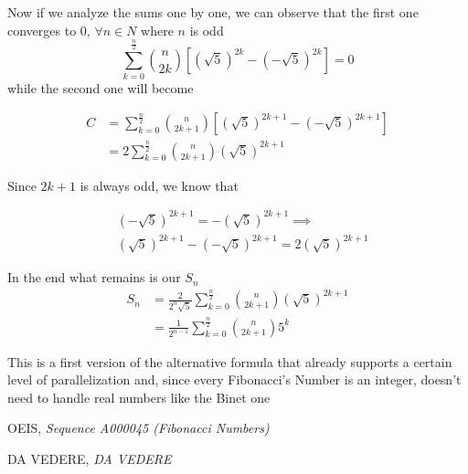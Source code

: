 \documentclass[amsmath,amssymb,aps,pra,reprint,groupedaddress,showpacs]{revtex4-1}
\begin{document}
Now if we analyze the sums one by one, we can observe that the first one converges to 0, $\forall n \in{N}$ where $n$ is odd
$$ \sum_{k=0}^{\frac{n}{2}} \binom{n}{2k} \left[ \left(\sqrt{5} \right) ^{2k} - \left(-\sqrt{5} \right) ^{2k} \right] = 0 $$
while the second one will become

\begin{align*}
C &= \sum_{k=0}^{\frac{n}{2}} \binom{n}{2k + 1} \left[ \left(\sqrt{5} \right) ^{2k + 1} - \left(-\sqrt{5} \right) ^{2k + 1} \right]\\
&= 2 \sum_{k=0}^\frac{n}{2} \binom{n}{2k + 1} \left(\sqrt{5} \right) ^{2k + 1}
\end{align*}

Since $2k + 1$ is always odd, we know that 

\begin{align*}
&\left(-\sqrt{5} \right) ^{2k + 1} =  - \left( \sqrt{5} \right) ^{2k + 1} \implies \\
&\left( \sqrt{5} \right) ^{2k + 1} - \left(-\sqrt{5} \right) ^{2k + 1} = 2\left(\sqrt{5} \right) ^{2k + 1}
\end{align*}

In the end what remains is our $S_n$
\begin{align*}
S_n &= \frac{2}{2^n\sqrt{5}} \sum_{k=0}^\frac{n}{2} \binom{n}{2k + 1} \left( \sqrt{5} \right) ^{2k +1} \\
&=\frac{1}{2^{n-1}} \sum_{k=0}^\frac{n}{2} \binom{n}{2k + 1}5^{k}
\end{align*}

This is a first version of the alternative formula that already supports a certain level of parallelization and, since every Fibonacci's Number is an integer, doesn't need to handle real numbers like the Binet one

\begin{thebibliography}{24}
 
    {OEIS},
    \textit{Sequence A000045 (Fibonacci Numbers)}

    {DA VEDERE},
    \textit{DA VEDERE}

  \end{thebibliography}
\end{document}
